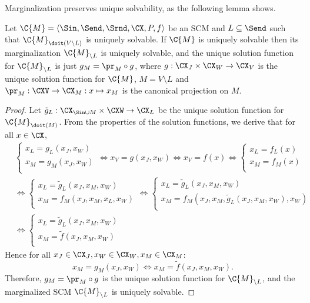Marginalization preserves unique solvability, as the following lemma shows.
\begin{Lem}\label{lem:marginalization_preserves_unique_solvability}
  Let $\C{M} = \langle \Sin, \Send, \Srnd, \CX, P, f \rangle$ be an SCM and $L \subseteq \Send$ such that
  $\C{M}_{\doit(V \setminus L)}$ is uniquely solvable.
  If $\C{M}$ is uniquely solvable then its marginalization $\C{M}_{\setminus L}$ is uniquely solvable, and the unique solution function for
  $\C{M}_{\setminus L}$ is just $g_M = \pr_M \circ g$, where $g : \CX_J \times \CX_W \to \CX_V$ is the 
  unique solution function for $\C{M}$, $M = V \setminus L$ and $\pr_M : \CXV \to \CX_M : x \mapsto x_M$ is the canonical projection on $M$.
\end{Lem}
\begin{proof}
  Let $\tilde{g}_L : \CX_{\Sin \cup M} \times \CXW \to \CX_L$
  be the unique solution function for $\C{M}_{\doit(M)}$.
  From the properties of the solution functions, we derive that
  for all $x \in \CX$,
  \begin{equation*}\begin{split}
  & \begin{cases}
    x_L = g_L(x_J,x_W) \\
    x_M = g_M(x_J,x_W) \\
  \end{cases}
  \iff x_V = g(x_J,x_W) \iff x_V = f(x) 
  \iff \begin{cases}
    x_L = f_L(x) \\
    x_M = f_M(x) \\
  \end{cases} \\
  & \iff \begin{cases}
    x_L = \tilde{g}_L(x_J,x_M,x_W) \\
    x_M = f_M(x_J,x_M,x_L,x_W) \\
  \end{cases}
  \iff \begin{cases}
    x_L = \tilde{g}_L(x_J,x_M,x_W) \\
    x_M = f_M(x_J,x_M,\tilde{g}_L(x_J,x_M,x_W),x_W) \\
  \end{cases} \\
  & \iff \begin{cases}
    x_L = \tilde{g}_L(x_J,x_M,x_W) \\
    x_M = \tilde{f}(x_J,x_M,x_W) \\
  \end{cases}
  \end{split}\end{equation*}
Hence for all $x_J \in \CX_J, x_W \in \CX_W, x_M \in \CX_M$:
$$x_M = g_M(x_J,x_W) \iff x_M = \tilde{f}(x_J,x_M,x_W).$$
Therefore, $g_M = \pr_M \circ g$ is the unique solution function for $\C{M}_{\setminus L}$, and the marginalized SCM $\C{M}_{\setminus L}$ is uniquely solvable.
\end{proof}
